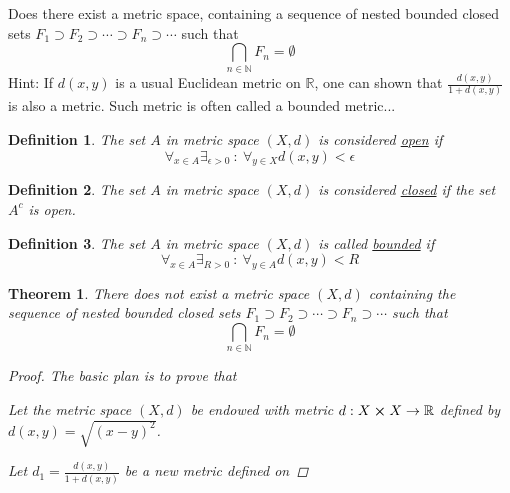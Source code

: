 \documentclass[]{article}
\newcommand{\R}{\mathbb{R}}
\newcommand{\N}{\mathbb{N}}
\newcommand{\st}{\ : \ }
\newtheorem{definition}{Definition}
\newtheorem{theorem}{Theorem}
\begin{document}
\newpage
\section{}
Does there exist a metric space, containing a sequence of nested bounded closed sets 
$F_1 \supset F_2 \supset \cdots \supset F_n \supset \cdots$
such that
\[
    \bigcap_{n \in \N} F_n = \emptyset
\]
Hint: If $d(x,y)$ is a usual Euclidean metric on $\R$, 
one can shown that $\frac{d(x,y)}{1 + d(x,y)}$ is also a metric.
Such metric is often called a bounded metric...

\begin{definition}
    The set $A$ in metric space $(X,d)$ is considered \emph{\underline{open}} if 
    \[
        \forall_{x \in A} \exists_{\epsilon > 0} \st \forall_{y \in X} d(x,y)<\epsilon
    \]
\end{definition}

\begin{definition}
    The set $A$ in metric space $(X,d)$ is considered \emph{\underline{closed}} if the set $A^c$ is open.
\end{definition}

\begin{definition}
    The set $A$ in metric space $(X,d)$ is called \emph{\underline{bounded}} if
    \[
        \forall_{x \in A} \exists_{R>0} \st \forall_{y\in A} d(x,y) < R
    \]
\end{definition}

\begin{theorem}
    There does not exist a metric space $(X,d)$ 
    containing the sequence of nested bounded closed sets 
    $F_1 \supset F_2 \supset \cdots \supset F_n \supset \cdots$
    such that \[
        \bigcap_{n \in \N} F_n = \emptyset
    \]
    \begin{proof}
        The basic plan is to prove that 
        
        Let the metric space $(X,d)$ be endowed with metric $d : X \cross X \to \R$ defined by $d(x,y) = \sqrt{(x - y)^2}$.
        

        Let $d_1 = \frac{d(x,y)}{1+d(x,y)}$ be a new metric defined on 
    

















    \end{proof}
\end{theorem}
\end{document}
